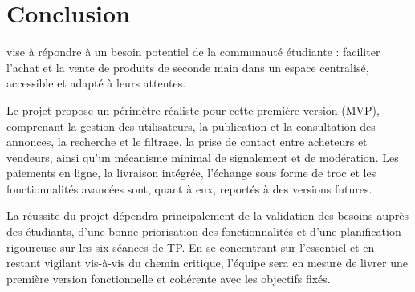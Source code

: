 ﻿\chapter{Conclusion}


\textbf{\nomProjet} vise à répondre à un besoin potentiel de la communauté étudiante : faciliter l'achat et la vente de produits de seconde main dans un espace centralisé, accessible et adapté à leurs attentes.

Le projet propose un périmètre réaliste pour cette première version (MVP), comprenant la gestion des utilisateurs, la publication et la consultation des annonces, la recherche et le filtrage, la prise de contact entre acheteurs et vendeurs, ainsi qu'un mécanisme minimal de signalement et de modération. Les paiements en ligne, la livraison intégrée, l'échange sous forme de troc et les fonctionnalités avancées sont, quant à eux, reportés à des versions futures.

La réussite du projet dépendra principalement de la validation des besoins auprès des étudiants, d'une bonne priorisation des fonctionnalités et d'une planification rigoureuse sur les six séances de TP. En se concentrant sur l'essentiel et en restant vigilant vis-à-vis du chemin critique, l'équipe sera en mesure de livrer une première version fonctionnelle et cohérente avec les objectifs fixés.
